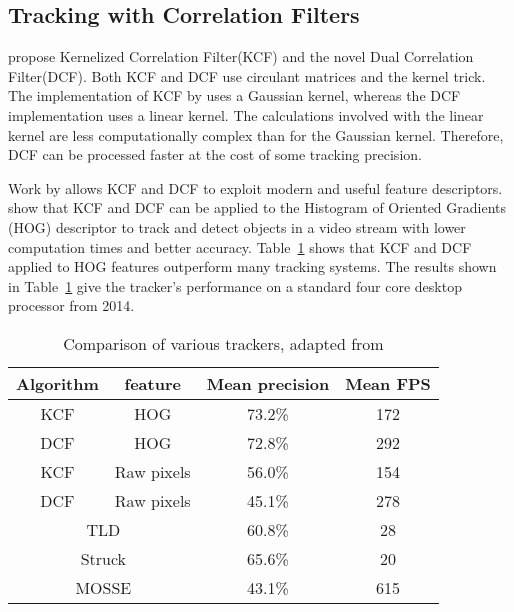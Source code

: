 \subsection{Tracking with Correlation Filters}
\citet{Enriques2014} propose Kernelized Correlation Filter(KCF) and the novel Dual Correlation Filter(DCF).
Both KCF and DCF use circulant matrices and the kernel trick.
The implementation of KCF by \citeauthor{Enriques2014} uses a Gaussian kernel, whereas the DCF implementation uses a linear kernel.
The calculations involved with the linear kernel are less computationally complex than for the Gaussian kernel. 
Therefore, DCF can be processed faster at the cost of some tracking precision.

Work by \citet{multichannelCorrFilters} allows KCF and DCF to exploit modern and useful feature descriptors.
\citeauthor{Enriques2014} show that KCF and DCF can be applied to the Histogram of Oriented Gradients (HOG) descriptor to track and detect objects in a video stream with lower computation times and better accuracy.
Table~\ref{tab:trackers} shows that KCF and DCF applied to HOG features outperform many tracking systems.
The results shown in Table~\ref{tab:trackers} give the tracker's performance on a standard four core desktop processor from 2014.

\begin{table}
  \centering
  \begin{tabular}[t]{cccc}
    \toprule
    Algorithm & feature & Mean precision & Mean FPS \\
    \midrule
    KCF       & HOG     & 73.2\%         & 172      \\
    \hline
    DCF       & HOG     & 72.8\%         & 292      \\
    \hline
    KCF       & Raw pixels & 56.0\%      & 154      \\
    \hline
    DCF       & Raw pixels & 45.1\%      & 278      \\
    \midrule
    \midrule
    \multicolumn{2}{c}{TLD}   & 60.8\%      &  28      \\
    \hline
    \multicolumn{2}{c}{Struck\cite{struck}}& 65.6\%     &  20     \\
    \hline
    \multicolumn{2}{c}{MOSSE\cite{mosse}}& 43.1\%      &  615     \\
    \bottomrule
  \end{tabular}
  \caption{Comparison of various trackers, adapted from \cite{Enriques2014}}
  \label{tab:trackers}
\end{table}

